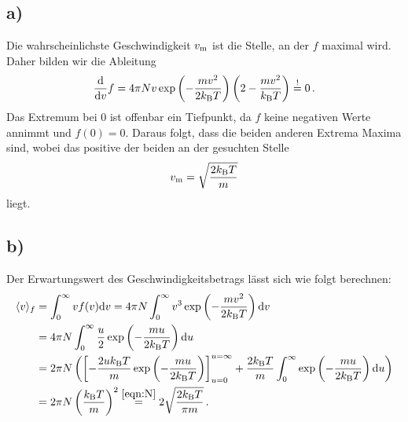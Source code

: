 \documentclass[a4paper, 11pt]{article}
\DeclarePairedDelimiter{\ev}{\langle}{\rangle}
\begin{document}
\subsection*{a)}
Die wahrscheinlichste Geschwindigkeit $v_\textup{m}$ ist die Stelle, an der $f$ maximal wird. Daher bilden wir die Ableitung
\begin{equation}
    \frac{\textup{d}}{\textup{d}v}f = 4\pi Nv\exp\left(-\frac{m v^2}{2 k_\textup{B}T}\right)\left(2 - \frac{mv^2}{k_\textup{B}T}\right) \stackrel{\textup{!}}{=} 0 \,.
\end{equation}
Das Extremum bei 0 ist offenbar ein Tiefpunkt, da $f$ keine negativen Werte annimmt und $f(0) = 0$. Daraus folgt, dass die beiden anderen Extrema Maxima sind, wobei das positive der beiden an der gesuchten Stelle
\begin{equation}
    v_\textup{m} = \sqrt{\frac{2 k_\textup{B} T}{m}} 
    \label{eqn:v_m}
\end{equation}
liegt.
\subsection*{b)}
Der Erwartungswert des Geschwindigkeitsbetrags lässt sich wie folgt berechnen:
\begin{align}
    \ev{v}_f &= \int_{0}^{\infty} v f(v) \textup{d}v = 4\pi N \int_{0}^{\infty} v^3 \exp\left(-\frac{mv^2}{2k_\textup{B}T}\right) \textup{d}v \\
    &= 4\pi N \int_{0}^{\infty} \frac{u}{2} \exp\left(-\frac{mu}{2k_\textup{B}T}\right) \textup{d}u \\
    &= 2\pi N\left(\left[-\frac{2uk_\textup{B}T}{m}\exp\left(-\frac{mu}{2k_\textup{B}T}\right)\right]_{u=0}^{u=\infty} + \frac{2k_\textup{B}T}{m}\int_{0}^{\infty}\exp\left(-\frac{mu}{2k_\textup{B}T}\right) \textup{d}u\right) \\
    &= 2\pi N\left(\frac{k_\textup{B}T}{m}\right)^2 \stackrel{\eqref{eqn:N}}{=} 2 \sqrt{\frac{2k_\textup{B}T}{\pi m}} \,.
\end{align}
\end{document}
